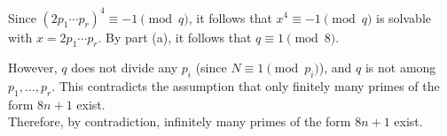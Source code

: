\begin{enumerate}
\begin{enumerate}
\begin{subprove}
      Since $(2p_1\cdots p_r)^4 \equiv -1 \pmod{q}$, it follows that $x^4 \equiv -1 \pmod{q}$ is solvable with $x = 2p_1\cdots p_r$.
      By part (a), it follows that $q \equiv 1 \pmod{8}$.
      
      However, $q$ does not divide any $p_i$ (since $N \equiv 1 \pmod{p_i}$), and $q$ is not among $p_1, \ldots, p_r$.
      This contradicts the assumption that only finitely many primes of the form $8n+1$ exist.\vspace*{10px}\\
      Therefore, by contradiction, infinitely many primes of the form $8n+1$ exist.
    \end{subprove}
  \end{enumerate}
\end{enumerate}
